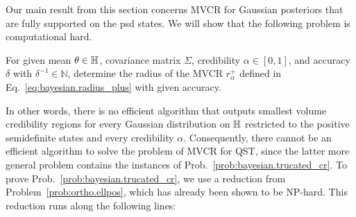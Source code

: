 Our main result from this section concerns MVCR for Gaussian posteriors that are fully supported on the psd states.
We will show that the following problem is computational hard.
\begin{problem}\label{prob:bayesian.trucated_cr}
  For given mean $\theta \in \mathbb{H}$, covariance matrix $\Sigma$, credibility $\alpha \in [0,1]$, and accuracy $\delta$ with $\delta^{-1} \in \mathbb{N}$, determine the radius of the MVCR $r^+_{\alpha}$ defined in Eq.~\eqref{eq:bayesian.radius_plus} with given accuracy.
\end{problem}
In other words, there is no efficient algorithm that outputs smallest volume credibility regions for every Gaussian distribution on $\mathbb{H}$ restricted to the positive semidefinite states and every credibility $\alpha$.
Consequently, there cannot be an efficient algorithm to solve the problem of MVCR for QST, since the latter more general problem contains the instances of Prob.~\ref{prob:bayesian.trucated_cr}.
To prove Prob.~\ref{prob:bayesian.trucated_cr}, we use a reduction from Problem~\ref{prob:ortho.ellpos}, which has already been shown to be NP-hard.
This reduction runs along the following lines:
